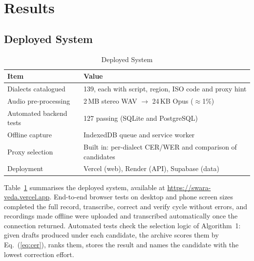\documentclass[conference]{IEEEtran}
\begin{document}
\section{Results}\label{sec:results}
\subsection{Deployed System}
\begin{table}[t]
\caption{Deployed System}
\label{tab:system}
\centering
\begin{tabular}{p{}p{}}
\toprule
Item & Value \\
\midrule
Dialects catalogued & 139, each with script, region, ISO code and proxy hint \\
Audio pre-processing & 2\,MB stereo WAV $\rightarrow$ 24\,KB Opus ($\approx$1\%) \\
Automated backend tests & 127 passing (SQLite and PostgreSQL) \\
Offline capture & IndexedDB queue and service worker \\
Proxy selection & Built in: per-dialect CER/WER and comparison of candidates \\
Deployment & Vercel (web), Render (API), Supabase (data) \\
\bottomrule
\end{tabular}
\end{table}
Table~\ref{tab:system} summarises the deployed system, available at \url{https://swara-veda.vercel.app}. End-to-end browser tests on desktop and phone screen sizes completed the full record, transcribe, correct and verify cycle without errors, and recordings made offline were uploaded and transcribed automatically once the connection returned. Automated tests check the selection logic of Algorithm~1: given drafts produced under each candidate, the archive scores them by Eq.~(\ref{eq:cer}), ranks them, stores the result and names the candidate with the lowest correction effort.
\end{document}
